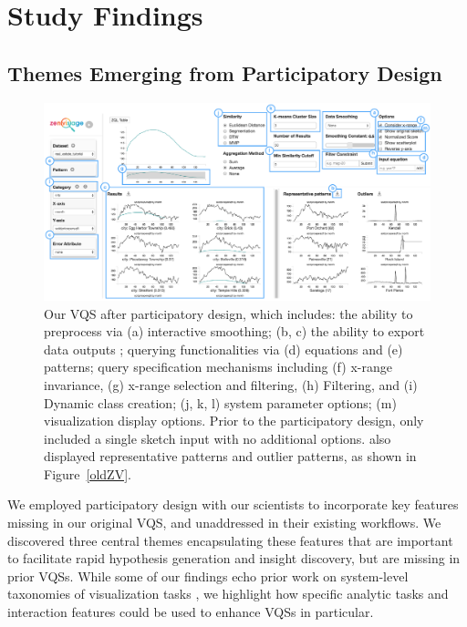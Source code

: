\section{Study Findings}
\subsection{Themes Emerging from Participatory Design\label{pd_findings}}
\begin{figure}[ht!]
\centering
\vspace{-15pt}
\includegraphics[width=\linewidth]{figures/newZV.pdf} %
\vspace{-5pt}\caption{Our VQS after participatory design, which includes: the ability to preprocess via (a) interactive smoothing; (b, c) the ability to export data outputs ; querying functionalities via (d) equations and (e) patterns; query specification mechanisms including (f) x-range invariance, (g) x-range selection and filtering, (h) Filtering, and (i) Dynamic class creation; (j, k, l) system parameter options; (m) visualization display options. Prior to the participatory design, \zv only included a single sketch input with no additional options. \zv also displayed representative patterns and outlier patterns, as shown in Figure~\ref{oldZV}.}
\label{zvOverview}
\vspace{-14pt}
\end{figure}

\par We employed participatory design with our scientists to incorporate key features  missing in our original VQS, and unaddressed in their existing workflows. We discovered three central themes encapsulating these features that are important to facilitate rapid hypothesis generation and insight discovery, but are missing in prior VQSs. While some of our findings echo prior work on system-level taxonomies of visualization tasks \cite{Amar2005,Heer2012}, we highlight how specific analytic tasks and interaction features could be used to enhance VQSs in particular. 
